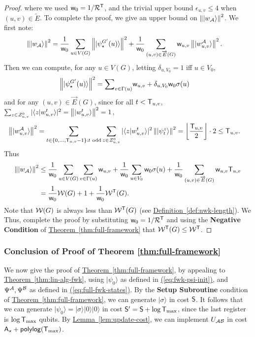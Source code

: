 \documentclass{article}
\newcommand{\eq}[1]{\hyperref[eq:#1]{(\ref*{eq:#1})}}
\newcommand{\thm}[1]{\hyperref[thm:#1]{Theorem~\ref*{thm:#1}}}
\newcommand{\lem}[1]{\hyperref[lem:#1]{Lemma~\ref*{lem:#1}}}
\newcommand{\defin}[1]{\hyperref[def:#1]{Definition~\ref*{def:#1}}}
\def\ket#1{{\lvert}#1\rangle}
\renewcommand{\>}{\rangle}
\newcommand{\<}{\langle}
\renewcommand{\(}{\left(}
\renewcommand{\)}{\right)}
\def\braket#1#2{{{\langle}#1\vert}#2\rangle}
\def\norm#1{\left\| #1 \right\|}
\def\w{{\sf w}}
\begin{document}
\begin{proof}
where we used $\w_0=1/{\cal R}^{\sf T}$, and the trivial upper bound $\epsilon_{u,v}\leq 4$ when $(u,v)\in \tilde{E}$. %
To complete the proof, we give an upper bound on $\norm{\ket{w_{\cal A}}}^2$. We first note:
\begin{align*}
\norm{\ket{w_{\cal A}}}^2 &= \frac{1}{\w_0}\sum_{u\in V(G)}\norm{\ket{\psi_{\star}^{G'}(u)}}^2+\frac{1}{\w_0}\sum_{(u,v)\in\overrightarrow{E}(G)}\w_{u,v}\norm{\ket{w_{u,v}^{\cal A}}}^2.
\end{align*}
Then we can compute, for any $u\in V(G)$, letting $\delta_{u,V_0}=1$ iff $u\in V_0$,
\begin{align*}
\norm{\ket{\psi_{\star}^{G'}(u)}}^2 &= \textstyle{\displaystyle\sum}_{v\in\Gamma(u)}\w_{u,v}+\delta_{u,V_0} \w_0\sigma(u)
\end{align*}
and for any $(u,v)\in\overrightarrow{E}(G)$, since for all $t<{\sf T}_{u,v}$, $\sum_{z\in {\cal Z}_{u,v}^0}|\braket{z}{w_{u,v}^t}|^2=\norm{\ket{w_{u,v}^t}}^2 =1$, 
\begin{align*}
\norm{\ket{w_{u,v}^{\cal A}}}^2 &= \sum_{t\in\{0,\dots,{\sf T}_{u,v}-1\}:t\text{ odd}}\sum_{z\in {\cal Z}_{u,v}^0}|\braket{z}{w_{u,v}^t}|^2\norm{\ket{\psi_t^{z}}}^2 
= \left\lfloor\frac{{\sf T}_{u,v}}{2}\right\rfloor  \cdot 2 \leq {\sf T}_{u,v}.
\end{align*}
Thus
\begin{align*}
\norm{\ket{w_{\cal A}}}^2 &\leq \frac{1}{\w_0}\sum_{u\in V(G)}\sum_{v\in\Gamma(u)}\w_{u,v}+\frac{1}{\w_0}\sum_{u\in V_0} \w_0\sigma(u)+\frac{1}{\w_0}\sum_{(u,v)\in\overrightarrow{E}(G)}\w_{u,v}{\sf T}_{u,v}\\
&= \frac{1}{\w_0}{\cal W}(G)+1+\frac{1}{\w_0}{\cal W}^{\sf T}(G).
\end{align*}
Note that ${\cal W}(G)$ is always less than ${\cal W}^{\sf T}(G)$ (see \defin{nwk-length}). We Thus, complete the proof by substituting $\w_0=1/{{\cal R}^{\sf T}}$ and using the \textbf{Negative Condition} of \thm{full-framework} that ${\cal W}^{\sf T}(G)\leq {\cal W}^{\sf T}$. 
\end{proof}




\subsubsection{Conclusion of Proof of Theorem \ref{thm:full-framework}}

We now give the proof of \thm{full-framework}, by appealing to \thm{lin-alg-fwk}, using $\ket{\psi_0}$ as defined in \eq{fwk-psi-init}, and $\Psi^{\cal A},\Psi^{\cal B}$ as defined in \eq{full-fwk-states}.
By the \textbf{Setup Subroutine} condition of \thm{full-framework}, we can generate $\ket{\sigma}$ in cost ${\sf S}$. It follows that we can generate $\ket{\psi_0}=\ket{\sigma}\ket{0}\ket{0}$ in cost ${\sf S}'={\sf S}+\log{\sf T}_{\max}$, since the last register is $\log {\sf T}_{\max}$ qubits. By \lem{update-cost}, we can implement $U_{\cal AB}$ in cost ${\sf A}_\star+{\sf polylog}({\sf T}_{\max})$. 
\end{document}
